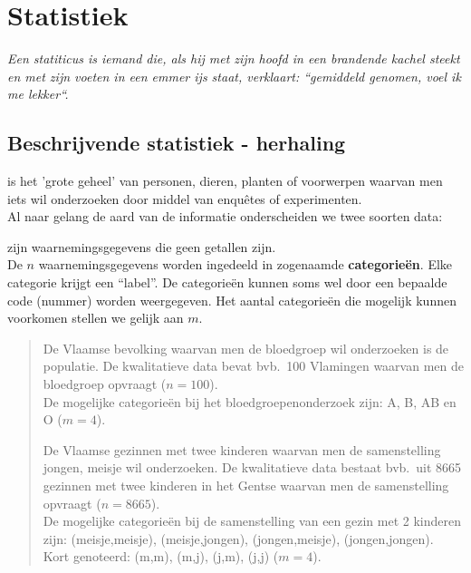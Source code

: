 


\chapter{Statistiek} 
{\large\em Een statiticus is iemand die, als hij met zijn hoofd in een brandende kachel steekt en met zijn voeten in een emmer ijs staat, verklaart: ``gemiddeld genomen, voel ik me lekker``.}
\section{Beschrijvende statistiek - herhaling}
\begin{small} 
\begin{description}
\item[Een populatie] is het 'grote geheel' van personen, dieren, planten of voorwerpen waarvan men iets wil onderzoeken door middel van enqu\^etes of experimenten.\\ 
Al naar gelang de aard van de informatie onderscheiden we twee soorten data:

\item[Kwalitatieve of niet-numerieke  data] zijn
  waarnemingsgegevens die geen getallen zijn. \\ De $n$ waar\-ne\-mingsgegevens worden ingedeeld in  zogenaamde  {\bf categorie\"en}. Elke categorie krijgt een ``label''. De categorie\"en kunnen soms wel door een bepaalde code (nummer) worden weergegeven. Het aantal  categorie\"en die mogelijk kunnen voorkomen  stellen we gelijk aan $m$.

 \begin{quotation}
\item De Vlaamse bevolking waarvan men de bloedgroep wil onderzoeken is de populatie. De kwalitatieve data bevat bvb.\ 100 Vlamingen waarvan men de bloedgroep opvraagt ($n=100$).  \\De mogelijke categorie\"en bij het bloedgroepenonderzoek zijn: A, B, AB en O  ($m=4$). 
\item De Vlaamse gezinnen met twee kinderen waarvan men de samenstelling jongen, meisje wil onderzoeken. De kwalitatieve data bestaat bvb.\ uit 8665 gezinnen met twee kinderen in het Gentse waarvan men de samenstelling opvraagt ($n=8665$).\\ De mogelijke categorie\"en bij de samenstelling van een gezin met 2 kinderen  zijn: (meisje,meisje), (meisje,jongen), (jongen,meisje), (jongen,jongen). \\Kort genoteerd: (m,m), (m,j), (j,m), (j,j) ($m=4$).
\end{quotation} 


\end{description}
\end{small}
